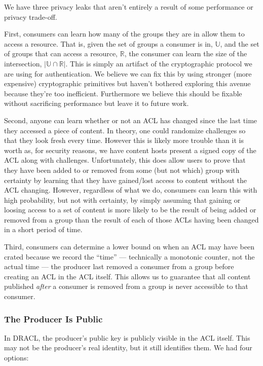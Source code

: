 \documentclass[pdftex,12pt,a4papaer,twoside,notitlepage]{report}
\begin{document}
We have three privacy leaks that aren't entirely a result of some performance or
privacy trade-off.

First, consumers can learn how many of the groups they are in allow them to
access a resource. That is, given the set of groups a consumer is in,
$\mathbb{U}$, and the set of groups that can access a resource, $\mathbb{R}$,
the consumer can learn the size of the intersection, $|\mathbb{U} \cap
\mathbb{R}|$. This is simply an artifact of the cryptographic protocol we are
using for authentication. We believe we can fix this by using stronger (more
expensive) cryptographic primitives but haven't bothered exploring this avenue
because they're too inefficient. Furthermore we believe this should be fixable
without sacrificing performance but leave it to future work.

Second, anyone can learn whether or not an ACL has changed since the last time
they accessed a piece of content. In theory, one could randomize challenges so
that they look fresh every time. However this is likely more trouble than it is
worth as, for security reasons, we have content hosts present a signed copy of
the ACL along with challenges. Unfortunately, this does allow users to prove
that they have been added to or removed from some (but not which) group with
certainty by learning that they have gained/lost access to content without the
ACL changing. However, regardless of what we do, consumers can learn this with
high probability, but not with certainty, by simply assuming that gaining or
loosing access to a set of content is more likely to be the result of being
added or removed from a group than the result of each of those ACLs having been
changed in a short period of time.

Third, consumers can determine a lower bound on when an ACL may have been crated
because we record the ``time'' --- technically a monotonic counter, not the
actual time --- the producer last removed a consumer from a group before creating
an ACL in the ACL itself. This allows us to guarantee that all content published
\emph{after} a consumer is removed from a group is never accessible to that
consumer.

\subsubsection{The Producer Is Public}
\label{sub:producer_public}

In DRACL, the producer's public key is publicly visible in the ACL itself. This
may not be the producer's real identity, but it still identifies them. We had
four options:
\end{document}
